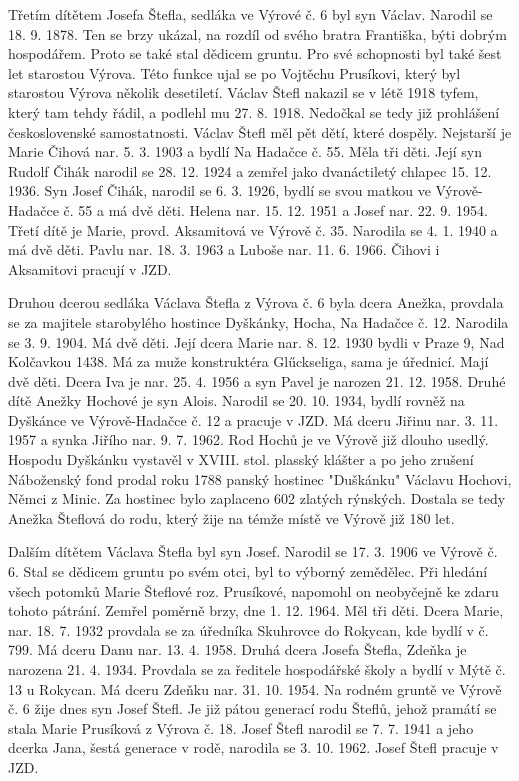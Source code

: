 \documentclass[../dejiny-rodu-prusiku.tex]{subfiles}
\begin{document}
Třetím dítětem Josefa Štefla, sedláka ve Výrové č. 6 byl syn Václav. Narodil se 18. 9. 1878. Ten se brzy uká­zal, na rozdíl od svého bratra Františka, býti dobrým hospodářem. Proto se také stal dědicem gruntu. Pro své schopnosti byl také šest let starostou Výrova. Této funkce ujal se po Vojtěchu Prusíkovi, který byl starostou Výrova několik desetiletí. Václav Štefl nakazil se v létě 1918 tyfem, který tam tehdy řádil, a podlehl mu 27. 8. 1918. Nedočkal se tedy již prohlášení československé samostatnosti. Václav Štefl měl pět dětí, které dospěly. Nejstarší je Marie Čihová  nar. 5. 3. 1903 a bydlí Na Hadačce č. 55. Měla tři děti. Její syn Rudolf Čihák narodil se 28. 12. 1924 a zemřel jako dvanáctiletý chlapec 15. 12. 1936. Syn Josef Čihák, narodil se 6. 3. 1926, bydlí se svou matkou ve Výrově-Hadačce č. 55 a má dvě děti. Helena nar. 15. 12. 1951 a Josef nar. 22. 9. 1954. Třetí dítě je Marie, provd. Aksamitová ve Výrově č. 35. Narodila se 4. 1. 1940 a má dvě děti. Pavlu nar. 18. 3. 1963 a Luboše nar. 11. 6. 1966. Čihovi i Aksamitovi pracují v JZD.

Druhou dcerou sedláka Václava Štefla z Výrova č. 6 byla dcera Anežka, provdala se za majitele staroby­lého hostince Dyškánky, Hocha, Na Hadačce č. 12. Narodila se 3. 9. 1904. Má dvě děti. Její dcera Marie nar. 8. 12. 1930 bydli v Praze 9, Nad Kolčavkou 1438. Má za muže konstruktéra Glűckseliga, sama je úřednicí. Mají dvě děti. Dcera Iva je nar. 25. 4. 1956 a syn Pavel je narozen 21. 12. 1958. Druhé dítě Anežky Hochové je syn Alois. Narodil se 20. 10. 1934, bydlí rovněž na Dyškánce ve Výrově-Hadačce č. 12 a pracuje v JZD. Má dceru Jiřinu nar. 3. 11. 1957 a synka Jiřího nar. 9. 7. 1962. Rod Hochů je ve Výrově již dlouho usedlý. Hospodu Dyškánku vystavěl v XVIII. stol. plasský klášter a po jeho zrušení Náboženský fond prodal roku 1788 panský hostinec "Duškánku" Václavu Hochovi, Němci z  Minic. Za hostinec bylo zaplaceno 602 zlatých rýnských. Dostala se tedy Anežka Šteflová do rodu, který žije na témže místě ve Výrově již 180 let.

Dalším dítětem Václava Štefla byl syn Josef. Narodil se 17. 3. 1906 ve Výrově č. 6. Stal se dědicem gruntu po svém otci, byl to výborný zemědělec. Při hledání všech potomků Marie Šteflové roz. Prusíkové, napomohl on neobyčejně ke zdaru tohoto pátrání. Zemřel poměrně brzy, dne 1. 12. 1964. Měl tři děti. Dcera Marie, nar. 18. 7. 1932 provdala se za úředníka Skuhrovce do Rokycan, kde bydlí v č. 799. Má dceru Danu nar. 13. 4. 1958. Druhá dcera Josefa Štefla, Zdeňka je narozena 21. 4. 1934. Provdala se za ředitele hospodářské školy a bydlí v Mýtě č. 13 u Rokycan. Má dceru Zdeňku nar. 31. 10. 1954. Na rodném gruntě ve Výrově č. 6 žije dnes syn Josef Štefl. Je již pátou generací rodu Šteflů, jehož pramátí se stala Marie Prusíková z Výrova č. 18. Josef Štefl narodil se 7. 7. 1941 a jeho dcerka Jana, šestá generace v rodě, narodila se 3. 10. 1962. Josef Štefl pracuje v JZD.
\end{document}
